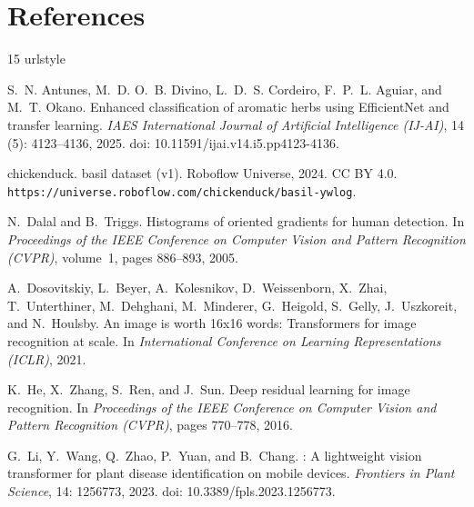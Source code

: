\documentclass[final]{article}
\begin{document}
\section*{References}
\renewcommand{\bibsection}{}%
\small
\begin{thebibliography}{15}
\providecommand{\natexlab}[1]{#1}
\providecommand{\url}[1]{\texttt{#1}}
\expandafter\ifx\csname urlstyle\endcsname\relax
  \providecommand{\doi}[1]{doi: #1}\else
  \providecommand{\doi}{doi: \begingroup \urlstyle{rm}\Url}\fi

S.~N. Antunes, M.~D. O.~B. Divino, L.~D.~S. Cordeiro, F.~P.~L. Aguiar, and
  M.~T. Okano.
\newblock Enhanced classification of aromatic herbs using {EfficientNet} and
  transfer learning.
\newblock \emph{IAES International Journal of Artificial Intelligence (IJ-AI)},
  14 (5): 4123--4136, 2025.
\newblock \doi{10.11591/ijai.v14.i5.pp4123-4136}.

{chickenduck}.
\newblock basil dataset (v1).
\newblock Roboflow Universe, 2024.
\newblock CC BY 4.0.
  \url{https://universe.roboflow.com/chickenduck/basil-ywlog}.

N.~Dalal and B.~Triggs.
\newblock Histograms of oriented gradients for human detection.
\newblock In \emph{Proceedings of the IEEE Conference on Computer Vision and
  Pattern Recognition (CVPR)}, volume~1, pages 886--893, 2005.

A.~Dosovitskiy, L.~Beyer, A.~Kolesnikov, D.~Weissenborn, X.~Zhai,
  T.~Unterthiner, M.~Dehghani, M.~Minderer, G.~Heigold, S.~Gelly, J.~Uszkoreit,
  and N.~Houlsby.
\newblock An image is worth 16x16 words: Transformers for image recognition at
  scale.
\newblock In \emph{International Conference on Learning Representations
  (ICLR)}, 2021.

K.~He, X.~Zhang, S.~Ren, and J.~Sun.
\newblock Deep residual learning for image recognition.
\newblock In \emph{Proceedings of the IEEE Conference on Computer Vision and
  Pattern Recognition (CVPR)}, pages 770--778, 2016.

G.~Li, Y.~Wang, Q.~Zhao, P.~Yuan, and B.~Chang.
: A lightweight vision transformer for plant disease
  identification on mobile devices.
\newblock \emph{Frontiers in Plant Science}, 14: 1256773, 2023.
\newblock \doi{10.3389/fpls.2023.1256773}.


\end{thebibliography}
\end{document}
